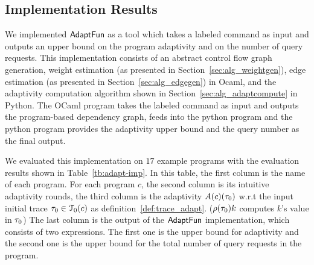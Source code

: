 \subsection{Implementation Results}
We implemented $\textsf{AdaptFun}$ as a tool which takes a labeled command as input  
and outputs an upper bound on the program adaptivity and on the number of query requests.
This implementation consists of an 
abstract control flow graph generation, weight estimation (as presented in Section~\ref{sec:alg_weightgen}),
edge estimation (as presented in Section~\ref{sec:alg_edgegen}) in Ocaml, 
and the adaptivity computation algorithm shown in Section~\ref{sec:alg_adaptcompute} in Python.
The OCaml program takes the labeled command as input and outputs the program-based dependency graph,
feeds into the python program and the python program provides the adaptivity upper bound and the query number as the final output.

We evaluated this implementation on $17$ example programs with the evaluation results shown  in Table~\ref{tb:adapt-imp}.
In this table,
the first column is the name of each program.
For each program $c$, the second column is its intuitive adaptivity rounds,
the third column is the adaptivity $A(c)(\mathtt{\tau}_0)$ w.r.t the input initial trace $\mathtt{\tau}_0 \in \mathcal{T}_0(c)$ as definition~\ref{def:trace_adapt}.
($\rho(\mathtt{\tau}_0) k$ computes $k$'s value in $\mathtt{\tau}_0$)
The last column is the output of the $\textsf{AdaptFun}$ implementation, which consists of two expressions.
The first one is the upper bound for adaptivity and the second one is the 
upper bound for the total number of query requests in the program.


